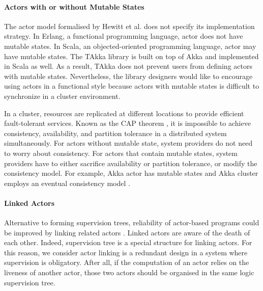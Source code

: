\paragraph{Actors with or without Mutable States}
The actor model formalised by Hewitt et al. \cite{Hewitt:1973} does not specify
its implementation strategy.  In Erlang, a functional programming language,
actor does not have mutable states.  In Scala, an objected-oriented
programming language, actor may have mutable states.  The TAkka library is
built on top of Akka and implemented in Scala as well.  As a result, TAkka does
not prevent users from defining actors with mutable states.  Nevertheless, the
library designers would like to encourage using actors in a functional
style because actors with mutable states is difficult to synchronize in a
cluster environment.

In a cluster, resources are replicated at different locations to provide
efficient fault-tolerant services.  Known as the CAP theorem \cite{CAP}, it is
impossible to achieve consistency, availability, and partition tolerance in a
distributed system simultaneously.  For actors without mutable state, system
providers do not need to worry about consistency.  For actors that contain
mutable states, system providers have to either sacrifice availability or
partition tolerance, or modify the consistency model.  For example, Akka actor
has mutable states and Akka cluster employs an eventual consistency
model \cite{Kuhn12}.

\paragraph{Linked Actors}
Alternative to forming supervision trees, reliability of actor-based programs
could be improved by linking related actors \cite{ErlangWeb}. Linked actors are
aware of the death of each other.  Indeed, supervision tree is a special
structure for linking actors.  For this reason, we consider actor linking is a
redundant design in a system where supervision is obligatory.  After all, if
the computation of an actor relies on the liveness of another actor, those two
actors should be organised in the same logic supervision tree.





